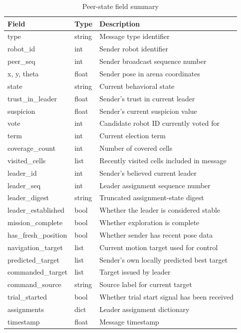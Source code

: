 \documentclass[a4paper,oneside,titlepage,11pt]{report}
\begin{document}
\begin{table}[H]
\centering
\caption{Peer-state field summary}
\begin{tabular}{p{} p{} p{}}
\toprule
\textbf{Field} & \textbf{Type} & \textbf{Description} \\
\midrule
type & string & Message type identifier \\
robot\_id & int & Sender robot identifier \\
peer\_seq & int & Sender broadcast sequence number \\
x, y, theta & float & Sender pose in arena coordinates \\
state & string & Current behavioral state \\
trust\_in\_leader & float & Sender's trust in current leader \\
suspicion & float & Sender's current suspicion value \\
vote & int & Candidate robot ID currently voted for \\
term & int & Current election term \\
coverage\_count & int & Number of covered cells \\
visited\_cells & list & Recently visited cells included in message \\
leader\_id & int & Sender's believed current leader \\
leader\_seq & int & Leader assignment sequence number \\
leader\_digest & string & Truncated assignment-state digest \\
leader\_established & bool & Whether the leader is considered stable \\
mission\_complete & bool & Whether exploration is complete \\
has\_fresh\_position & bool & Whether sender has recent pose data \\
navigation\_target & list & Current motion target used for control \\
predicted\_target & list & Sender's own locally predicted best target \\
commanded\_target & list & Target issued by leader \\
command\_source & string & Source label for current target \\
trial\_started & bool & Whether trial start signal has been received \\
assignments & dict & Leader assignment dictionary \\
timestamp & float & Message timestamp \\
\bottomrule
\end{tabular}
\end{table}
\end{document}
